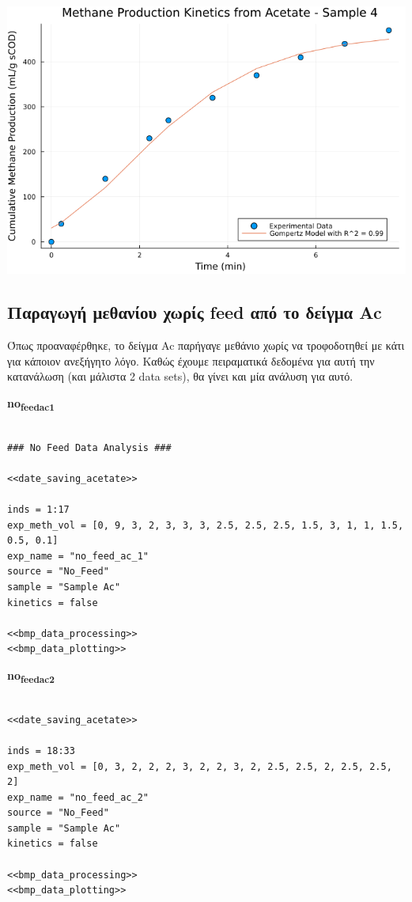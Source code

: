 \documentclass[11pt]{article}
\begin{document}
\begin{center}
\includegraphics[width=.9\linewidth]{../plots/BMPs/Acetate/methane_kinetics_acet_test_4.png}
\end{center}

\subsection{Παραγωγή μεθανίου χωρίς feed από το δείγμα Ac}
\label{sec:org0dfc3ec}
Όπως προαναφέρθηκε, το δείγμα Ac παρήγαγε μεθάνιο χωρίς να τροφοδοτηθεί με κάτι για κάποιον ανεξήγητο λόγο. Καθώς έχουμε πειραματικά δεδομένα για αυτή την κατανάλωση (και μάλιστα 2 data sets), θα γίνει και μία ανάλυση για αυτό.

\textbf{no\textsubscript{feed}\textsubscript{ac}\textsubscript{1}}
\begin{verbatim}

### No Feed Data Analysis ###

<<date_saving_acetate>>

inds = 1:17
exp_meth_vol = [0, 9, 3, 2, 3, 3, 3, 2.5, 2.5, 2.5, 1.5, 3, 1, 1, 1.5, 0.5, 0.1]
exp_name = "no_feed_ac_1"
source = "No_Feed"
sample = "Sample Ac"
kinetics = false

<<bmp_data_processing>>
<<bmp_data_plotting>>
\end{verbatim}

\textbf{no\textsubscript{feed}\textsubscript{ac}\textsubscript{2}}
\begin{verbatim}

<<date_saving_acetate>>

inds = 18:33
exp_meth_vol = [0, 3, 2, 2, 2, 3, 2, 2, 3, 2, 2.5, 2.5, 2, 2.5, 2.5, 2]
exp_name = "no_feed_ac_2"
source = "No_Feed"
sample = "Sample Ac"
kinetics = false

<<bmp_data_processing>>
<<bmp_data_plotting>>
\end{verbatim}
\end{document}
